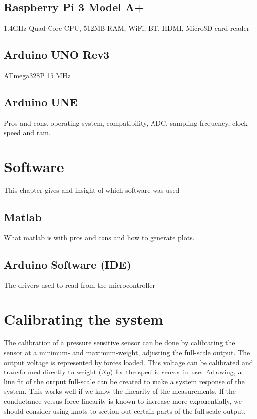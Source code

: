 \subsection{Raspberry Pi 3 Model A+}
1.4GHz Quad Core CPU, 512MB RAM, WiFi, BT, HDMI, MicroSD-card reader

\subsection{Arduino UNO Rev3}
\label{sec:arduinouno}
ATmega328P 16 MHz

\subsection{Arduino UNE}
Pros and cons, operating system, compatibility, ADC, sampling frequency, clock speed and ram.

\section{Software}
\label{sec:software}
This chapter gives and insight of which software was used

\subsection{Matlab}
\label{subsec:matlab}
What matlab is with pros and cons and how to generate plots.

\subsection{Arduino Software (IDE)}
The drivers used to read from the microcontroller

\section{Calibrating the system}
\label{sec:calibration}
The calibration of a pressure sensitive sensor can be done by calibrating the sensor at a minimum- and maximum-weight, adjusting the full-scale output. The output voltage is represented by forces loaded. This voltage can be calibrated and transformed directly to weight ($Kg$) for the specific sensor in use. Following, a line fit of the output full-scale can be created to make a system response of the system. This works well if we know the linearity of the measurements. If the conductance versus force linearity is known to increase more exponentially, we should consider using knots to section out certain parts of the full scale output.
